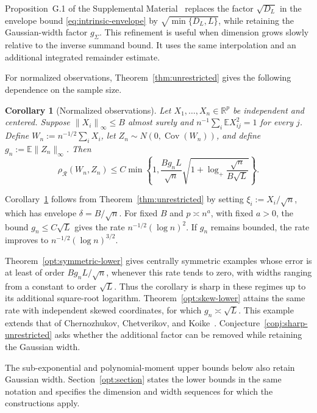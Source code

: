 \documentclass[11pt,letterpaper,twoside,leqno]{article}
\theoremstyle{bookplain}
\newtheorem{corollary}{Corollary}
\theoremstyle{bookremark}
\newcommand{\E}{\mathbb E}
\newcommand{\R}{\mathbb R}
\newcommand{\Cov}{\operatorname{Cov}}
\newcommand{\norm}[1]{\left\lVert#1\right\rVert}
\newcommand{\rh}{\rho_{\mathcal R}}
\begin{document}
Proposition~G.1 of the Supplemental Material~\cite{Supplement2026}
replaces the factor \(\sqrt{D_L}\) in the envelope bound
\eqref{eq:intrinsic-envelope} by \(\sqrt{\min\{D_L,L\}}\),
while retaining the Gaussian-width factor \(g_\Sigma\).
This refinement is useful when dimension grows slowly relative to the
inverse summand bound. It uses the same interpolation and an additional
integrated remainder estimate.

For normalized observations, Theorem~\ref{thm:unrestricted} gives
the following dependence on the sample size.

\begin{corollary}[Normalized observations]\label{cor:observations}
{
Let \(X_1,\ldots,X_n\in\R^p\) be independent and centered. Suppose
\(\norm{X_i}_\infty\le B\) almost surely and
\(n^{-1}\sum_i\E X_{ij}^2=1\) for every \(j\). Define
\(W_n:=n^{-1/2}\sum_iX_i\), let \(Z_n\sim N(0,\Cov(W_n))\),
and define \(g_n:=\E\|Z_n\|_\infty\). Then
\begin{equation}\label{eq:observations-intrinsic}
 \rh(W_n,Z_n)\le C\min\!\left\{1,
 \frac{B g_n L}{\sqrt n}
 \sqrt{1+\log_+\frac{\sqrt n}{B\sqrt L}}\right\}.
\end{equation}
}
\end{corollary}

{
Corollary~\ref{cor:observations} follows from Theorem~\ref{thm:unrestricted}
by setting \(\xi_i:=X_i/\sqrt n\), which has envelope
\(\delta=B/\sqrt n\). For fixed \(B\) and \(p\asymp n^a\), with
fixed \(a>0\), the bound \(g_n\le C\sqrt L\) gives the rate
\(n^{-1/2}(\log n)^2\). If \(g_n\) remains bounded, the rate improves
to \(n^{-1/2}(\log n)^{3/2}\).

Theorem~\ref{opt:symmetric-lower} gives centrally symmetric examples
whose error is at least of order \(B g_nL/\sqrt n\), whenever
this rate tends to zero, with widths ranging from a constant to
order \(\sqrt L\). Thus the corollary is sharp in these regimes
up to its additional square-root logarithm. Theorem~\ref{opt:skew-lower}
attains the same rate with independent skewed coordinates, for which
\(g_n\asymp\sqrt L\). This example extends that of
Chernozhukov, Chetverikov, and Koike~\cite[Proposition~2.1]{CCK}.
Conjecture~\ref{conj:sharp-unrestricted} asks whether the additional
factor can be removed while retaining the Gaussian width.

The sub-exponential and polynomial-moment upper bounds below also
retain Gaussian width. Section~\ref{opt:section} states the lower
bounds in the same notation and specifies the dimension and width
sequences for which the constructions apply.
}
\end{document}
